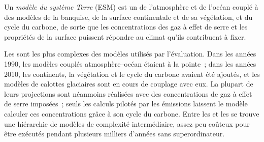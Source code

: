 \begin{definition}\label{def:b3:climate-models:esm}
Un \emph{modèle du système Terre} (ESM) est un  de l'atmosphère et de l'océan couplé à des modèles de la
banquise, de la surface continentale et de sa végétation, et du cycle du carbone, de sorte que
les concentrations des gaz à effet de serre et les propriétés de la
surface puissent répondre au climat qu'ils contribuent à fixer.
\end{definition}

Les  sont les plus complexes des modèles utilisés par l'évaluation. Dans
les années 1990, les modèles couplés atmosphère--océan étaient à la pointe~;
dans les années 2010, les continents, la végétation et le cycle du carbone avaient été ajoutés, et
les modèles de calottes glaciaires sont en cours de couplage avec eux. La plupart de leurs projections sont
néanmoins réalisées avec des concentrations de gaz à effet de serre imposées~;
seuls les calculs pilotés par les émissions laissent le modèle calculer ces concentrations grâce à son cycle du carbone.
Entre les  et les  se trouve une hiérarchie de modèles
de complexité intermédiaire, assez peu coûteux pour être exécutés pendant plusieurs milliers
d'années sans superordinateur.

